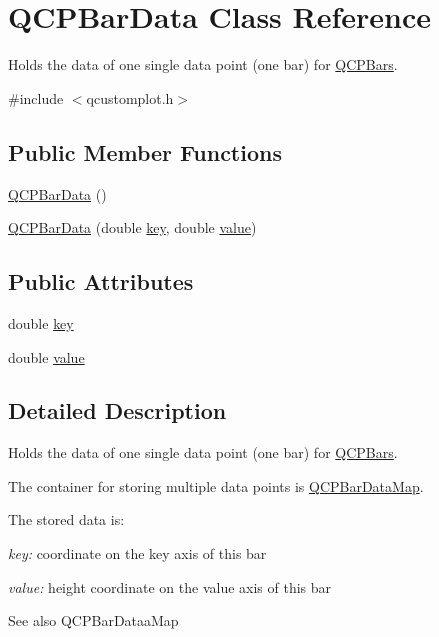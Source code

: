 \hypertarget{class_q_c_p_bar_data}{}\section{Q\+C\+P\+Bar\+Data Class Reference}
\label{class_q_c_p_bar_data}


Holds the data of one single data point (one bar) for \hyperlink{class_q_c_p_bars}{Q\+C\+P\+Bars}.  




{\ttfamily \#include $<$qcustomplot.\+h$>$}

\subsection*{Public Member Functions}
\begin{DoxyCompactItemize}
\item 
\hyperlink{class_q_c_p_bar_data_a8d214eda9ef41bc6da2a908a09623836}{Q\+C\+P\+Bar\+Data} ()
\item 
\hyperlink{class_q_c_p_bar_data_ac0bb7ede5373a7b18713418fa78f972d}{Q\+C\+P\+Bar\+Data} (double \hyperlink{class_q_c_p_bar_data_afe544b035ef19027ea3d65adeaf81b42}{key}, double \hyperlink{class_q_c_p_bar_data_acab57005d8916d61b64e9ddef6113b60}{value})
\end{DoxyCompactItemize}
\subsection*{Public Attributes}
\begin{DoxyCompactItemize}
\item 
double \hyperlink{class_q_c_p_bar_data_afe544b035ef19027ea3d65adeaf81b42}{key}
\item 
double \hyperlink{class_q_c_p_bar_data_acab57005d8916d61b64e9ddef6113b60}{value}
\end{DoxyCompactItemize}


\subsection{Detailed Description}
Holds the data of one single data point (one bar) for \hyperlink{class_q_c_p_bars}{Q\+C\+P\+Bars}. 

The container for storing multiple data points is \hyperlink{qcustomplot_8h_aa846c77472cae93def9f1609d0c57191}{Q\+C\+P\+Bar\+Data\+Map}.

The stored data is\+: \begin{DoxyItemize}
\item {\itshape key\+:} coordinate on the key axis of this bar \item {\itshape value\+:} height coordinate on the value axis of this bar\end{DoxyItemize}
\begin{DoxySeeAlso}{See also}
Q\+C\+P\+Bar\+Dataa\+Map 
\end{DoxySeeAlso}


